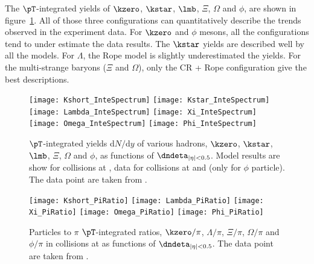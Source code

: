 \documentclass[ALICE,manyauthors]{StrinJet}
\begin{document}
The $\pT$-integrated yields of $\kzero$, $\kstar$, $\lmb$, $\Xi$, $\Omega$ and $\phi$, are shown in figure~\ref{fig:InclIntePar}. All of those three configurations can quantitatively  describe the trends observed in the experiment data. For $\kzero$ and $\phi$ mesons, all the configurations tend to under estimate the data results. The $\kstar$ yields are described well by all the models. For $\Lambda$, the Rope model is slightly underestimated the yields. For the multi-strange baryons ($\Xi$ and $\Omega$), only the CR + Rope configuration give the best descriptions.
\begin{figure}[ht]
	\begin{center}
		\texttt{[image: Kshort\_InteSpectrum]}
		\texttt{[image: Kstar\_InteSpectrum]}
		\texttt{[image: Lambda\_InteSpectrum]}
		\texttt{[image: Xi\_InteSpectrum]}
		\texttt{[image: Omega\_InteSpectrum]}
		\texttt{[image: Phi\_InteSpectrum]}
	\end{center}
	\caption{$\pT$-integrated yields d$N/$d$y$ of various hadrons, $\kzero$, $\kstar$, $\lmb$, $\Xi$, $\Omega$ and $\phi$, as functions of $\dndeta_{|\eta| < 0.5}$. Model results are show for \pp collisions at \seven, data for \pp collisions at \seven and \thirteen (only for $\phi$ particle). The data point are taken from \cite{ALICE:2016fzo, ALICE:2019etb}.}
	\label{fig:InclIntePar}
\end{figure}
\begin{figure}[ht]
	\begin{center}
		\texttt{[image: Kshort\_PiRatio]}
		\texttt{[image: Lambda\_PiRatio]}
		\texttt{[image: Xi\_PiRatio]}
		\texttt{[image: Omega\_PiRatio]}
		\texttt{[image: Phi\_PiRatio]}	
	\end{center}
	\caption{Particles to $\pi$ $\pT$-integrated ratios, $\kzero/\pi$, $\Lambda/\pi$, $\Xi/\pi$, $\Omega/\pi$ and $\phi/\pi$ in \pp collisions at \seven as functions of $\dndeta_{|\eta| < 0.5}$. The data point are taken from  \cite{ALICE:2016fzo, ALICE:2018pal}.}
	\label{fig:InclIntePartoPiRatio}
\end{figure}
\end{document}
